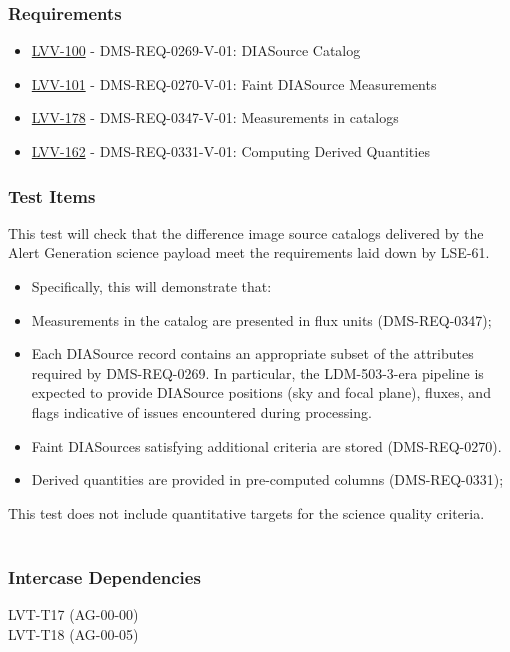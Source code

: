 \subsubsection{Requirements}
\begin{itemize}
\item \href{https://jira.lsstcorp.org/browse/LVV-100}{LVV-100} - DMS-REQ-0269-V-01: DIASource Catalog
\item \href{https://jira.lsstcorp.org/browse/LVV-101}{LVV-101} - DMS-REQ-0270-V-01: Faint DIASource Measurements
\item \href{https://jira.lsstcorp.org/browse/LVV-178}{LVV-178} - DMS-REQ-0347-V-01: Measurements in catalogs
\item \href{https://jira.lsstcorp.org/browse/LVV-162}{LVV-162} - DMS-REQ-0331-V-01: Computing Derived Quantities
\end{itemize}

\subsubsection{Test Items}
This test will check that the difference image source catalogs delivered
by the Alert Generation science payload meet the requirements laid down
by LSE-61.

\begin{itemize}
\tightlist
\item
  Specifically, this will demonstrate that:
\item
  Measurements in the catalog are presented in flux units
  (DMS-REQ-0347);
\item
  Each DIASource record contains an appropriate subset of the attributes
  required by DMS-REQ-0269. In particular, the LDM-503-3-era pipeline is
  expected to provide DIASource positions (sky and focal plane), fluxes,
  and flags indicative of issues encountered during processing.
\item
  Faint DIASources satisfying additional criteria are stored
  (DMS-REQ-0270).
\item
  Derived quantities are provided in pre-computed columns
  (DMS-REQ-0331);
\end{itemize}

This test does not include quantitative targets for the science quality
criteria.\\
~\\



\subsubsection{Intercase Dependencies}
LVT-T17 (AG-00-00)\\
LVT-T18 (AG-00-05)


